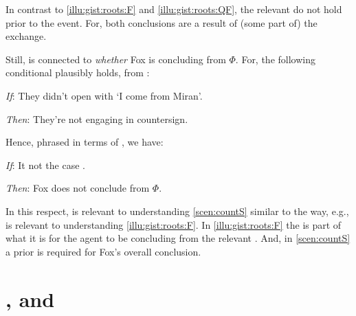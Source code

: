 \begin{note}
  In contrast to  \ref{illu:gist:roots:F} and \ref{illu:gist:roots:QF}, the relevant \fofr{} do not hold prior to the event.
  For, both conclusions are a result of (some part of) the exchange.

  Still,  is connected to \emph{whether} Fox is concluding  from \(\Phi\).
  For, the following conditional plausibly holds, from :

  \begin{itenum}
  \item[\emph{If}:]
    They didn't open with `I come from Miran'.
  \item[\emph{Then}:]
    They're not engaging in countersign.
  \end{itenum}

  \noindent%
  Hence, phrased in terms of , we have:
  \begin{itenum}
  \item[\emph{If}:]
    It not the case .
  \item[\emph{Then}:]
    Fox does not conclude  from \(\Phi\).
  \end{itenum}
  In this respect,  is relevant to understanding \autoref{scen:countS} similar to the way, e.g.,  is relevant to understanding \autoref{illu:gist:roots:F}.
  In \autoref{illu:gist:roots:F} the \fingfr{} is part of what it is for the agent to be concluding  from the relevant \pool{}.
  And, in \autoref{scen:countS} a prior  is required for Fox's overall conclusion.
\end{note}



\section*{\qWhy{}, \qHow{} and \issueInclusion{}}
\label{cha:intro:why-how}


